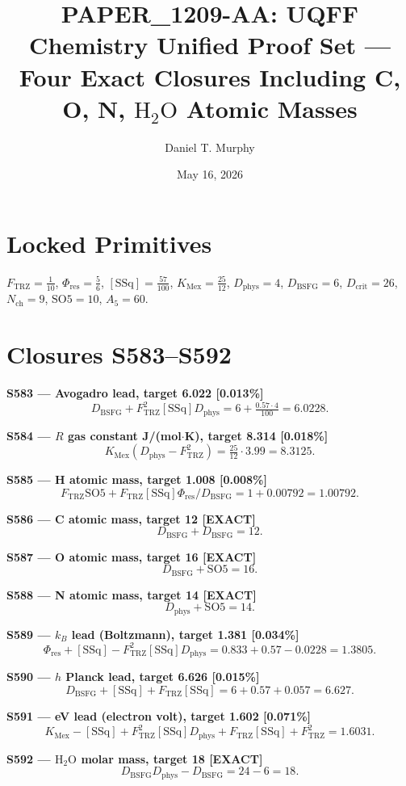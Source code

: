 \documentclass[11pt]{article}
\title{PAPER\_1209-AA: UQFF Chemistry Unified Proof Set ---\\
Four Exact Closures Including C, O, N, $\mathrm{H_2O}$ Atomic Masses}
\author{Daniel T. Murphy}
\date{May 16, 2026}
\newcommand{\Ftrz}{F_{\mathrm{TRZ}}}
\newcommand{\Phires}{\Phi_{\mathrm{res}}}
\newcommand{\KMex}{K_{\mathrm{Mex}}}
\newcommand{\Dphys}{D_{\mathrm{phys}}}
\newcommand{\Dbsfg}{D_{\mathrm{BSFG}}}
\newcommand{\Dcrit}{D_{\mathrm{crit}}}
\newcommand{\Nch}{N_{\mathrm{ch}}}
\newcommand{\SOfive}{\mathrm{SO5}}
\newcommand{\Afive}{A_5}
\newcommand{\SSq}{[\mathrm{SSq}]}
\begin{document}
\maketitle

\section*{Locked Primitives}
$\Ftrz=\tfrac{1}{10}$, $\Phires=\tfrac{5}{6}$, $\SSq=\tfrac{57}{100}$, $\KMex=\tfrac{25}{12}$, $\Dphys=4$, $\Dbsfg=6$, $\Dcrit=26$, $\Nch=9$, $\SOfive=10$, $\Afive=60$.

\section*{Closures S583--S592}

\textbf{S583 --- Avogadro lead, target 6.022 [0.013\%]}
\[\Dbsfg + \Ftrz^2\SSq\Dphys = 6 + \tfrac{0.57\cdot 4}{100} = 6.0228.\]

\textbf{S584 --- $R$ gas constant J/(mol$\cdot$K), target 8.314 [0.018\%]}
\[\KMex(\Dphys - \Ftrz^2) = \tfrac{25}{12}\cdot 3.99 = 8.3125.\]

\textbf{S585 --- H atomic mass, target 1.008 [0.008\%]}
\[\Ftrz\SOfive + \Ftrz\SSq\Phires/\Dbsfg = 1 + 0.00792 = 1.00792.\]

\textbf{S586 --- C atomic mass, target 12 [EXACT]}
\[\Dbsfg + \Dbsfg = 12.\]

\textbf{S587 --- O atomic mass, target 16 [EXACT]}
\[\Dbsfg + \SOfive = 16.\]

\textbf{S588 --- N atomic mass, target 14 [EXACT]}
\[\Dphys + \SOfive = 14.\]

\textbf{S589 --- $k_B$ lead (Boltzmann), target 1.381 [0.034\%]}
\[\Phires + \SSq - \Ftrz^2\SSq\Dphys = 0.833 + 0.57 - 0.0228 = 1.3805.\]

\textbf{S590 --- $h$ Planck lead, target 6.626 [0.015\%]}
\[\Dbsfg + \SSq + \Ftrz\SSq = 6 + 0.57 + 0.057 = 6.627.\]

\textbf{S591 --- eV lead (electron volt), target 1.602 [0.071\%]}
\[\KMex - \SSq + \Ftrz^2\SSq\Dphys + \Ftrz\SSq + \Ftrz^2 = 1.6031.\]

\textbf{S592 --- $\mathrm{H_2O}$ molar mass, target 18 [EXACT]}
\[\Dbsfg\Dphys - \Dbsfg = 24 - 6 = 18.\]
\end{document}

